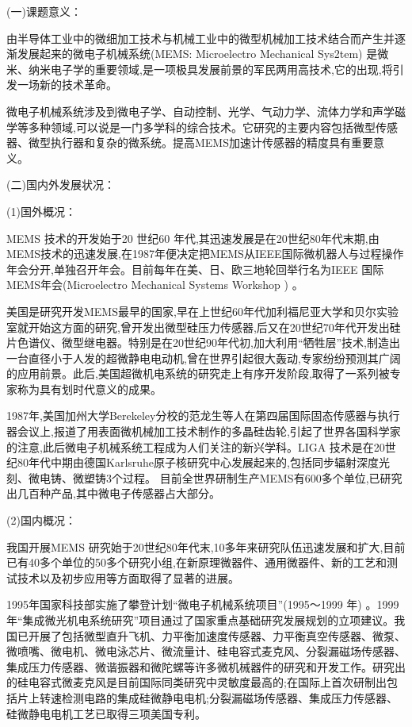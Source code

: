      {  {\heiti (一)课题意义：}

 由半导体工业中的微细加工技术与机械工业中的微型机械加工技术结合而产生并逐渐发展起来的微电子机械系统(MEMS: Microelectro Mechanical Sys2tem) 是微米、纳米电子学的重要领域,是一项极具发展前景的军民两用高技术,它的出现,将引发一场新的技术革命。

微电子机械系统涉及到微电子学、自动控制、光学、气动力学、流体力学和声学磁学等多种领域,可以说是一门多学科的综合技术。它研究的主要内容包括微型传感器、微型执行器和复杂的微系统。提高MEMS加速计传感器的精度具有重要意义。

{\noindent\heiti (二)国内外发展状况：}

(1)国外概况：

MEMS 技术的开发始于20 世纪60 年代,其迅速发展是在20世纪80年代末期,由MEMS技术的迅速发展,在1987年便决定把MEMS从IEEE国际微机器人与过程操作年会分开,单独召开年会。目前每年在美、日、欧三地轮回举行名为IEEE 国际MEMS年会(Microelectro Mechanical Systems Workshop ) 。

美国是研究开发MEMS最早的国家,早在上世纪60年代加利福尼亚大学和贝尔实验室就开始这方面的研究,曾开发出微型硅压力传感器,后又在20世纪70年代开发出硅片色谱仪、微型继电器。特别是在20世纪90年代初,加大利用“牺牲层”技术,制造出一台直径小于人发的超微静电电动机,曾在世界引起很大轰动,专家纷纷预测其广阔的应用前景。此后,美国超微机电系统的研究走上有序开发阶段,取得了一系列被专家称为具有划时代意义的成果。

1987年,美国加州大学Berekeley分校的范龙生等人在第四届国际固态传感器与执行器会议上,报道了用表面微机械加工技术制作的多晶硅齿轮,引起了世界各国科学家的注意,此后微电子机械系统工程成为人们关注的新兴学科。LIGA 技术是在20世纪80年代中期由德国Karlsruhe原子核研究中心发展起来的,包括同步辐射深度光刻、微电铸、微塑铸3个过程。
目前全世界研制生产MEMS有600多个单位,已研究出几百种产品,其中微电子传感器占大部分。


     (2)国内概况：

我国开展MEMS 研究始于20世纪80年代末,10多年来研究队伍迅速发展和扩大,目前已有40多个单位的50多个研究小组,在新原理微器件、通用微器件、新的工艺和测试技术以及初步应用等方面取得了显著的进展。

1995年国家科技部实施了攀登计划“微电子机械系统项目”(1995～1999 年) 。1999年“集成微光机电系统研究”项目通过了国家重点基础研究发展规划的立项建议。我国已开展了包括微型直升飞机、力平衡加速度传感器、力平衡真空传感器、微泵、微喷嘴、微电机、微电泳芯片、微流量计、硅电容式麦克风、分裂漏磁场传感器、集成压力传感器、微谐振器和微陀螺等许多微机械器件的研究和开发工作。研究出的硅电容式微麦克风是目前国际同类研究中灵敏度最高的;在国际上首次研制出包括片上转速检测电路的集成硅微静电电机;分裂漏磁场传感器、集成压力传感器、硅微静电电机工艺已取得三项美国专利。

}
